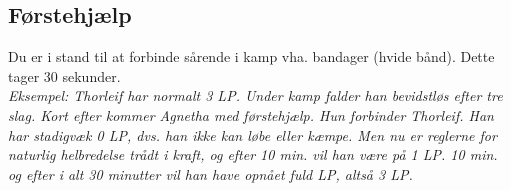 \subsection*{Førstehjælp}
Du er i stand til at forbinde sårende i kamp vha. bandager (hvide bånd). Dette tager 30 sekunder.\\
\textit{Eksempel: Thorleif har normalt 3 LP. Under kamp falder han bevidstløs efter tre slag. Kort efter kommer Agnetha med førstehjælp. Hun forbinder Thorleif. Han har stadigvæk 0 LP, dvs. han ikke kan løbe eller kæmpe. Men nu er reglerne for naturlig helbredelse trådt i kraft, og efter 10 min. vil han være på 1 LP. 10 min. og efter i alt 30 minutter vil han have opnået fuld LP, altså 3 LP.}